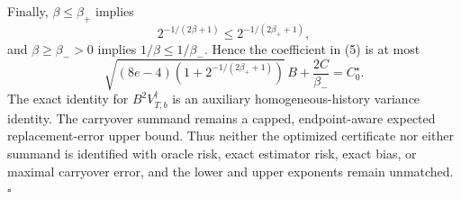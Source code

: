 Finally, \(\beta\le\beta_+\) implies
\[
2^{-1/(2\beta+1)}\le2^{-1/(2\beta_++1)},
\]
and \(\beta\ge\beta_->0\) implies \(1/\beta\le1/\beta_-\). Hence the coefficient in (5) is at most
\[
\sqrt{(8e-4)\left(1+2^{-1/(2\beta_++1)}\right)}\,B+\frac{2C}{\beta_-}=C_0^\star.
\]
The exact identity for \(B^2V_{T,b}^{\dagger}\) is an auxiliary homogeneous-history variance identity. The carryover summand remains a capped, endpoint-aware expected replacement-error upper bound. Thus neither the optimized certificate nor either summand is identified with oracle risk, exact estimator risk, exact bias, or maximal carryover error, and the lower and upper exponents remain unmatched. \(\square\)